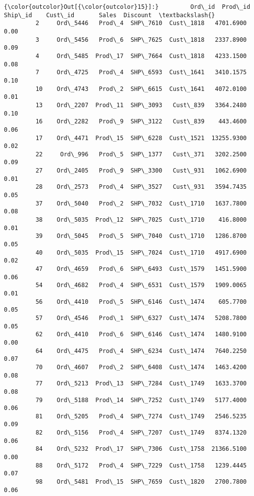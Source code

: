 \documentclass[11pt]{article}
\begin{document}
\begin{Verbatim}[commandchars=\\\{\}]
{\color{outcolor}Out[{\color{outcolor}15}]:}         Ord\_id  Prod\_id   Ship\_id    Cust\_id       Sales  Discount  \textbackslash{}
         2     Ord\_5446   Prod\_4  SHP\_7610  Cust\_1818   4701.6900      0.00   
         3     Ord\_5456   Prod\_6  SHP\_7625  Cust\_1818   2337.8900      0.09   
         4     Ord\_5485  Prod\_17  SHP\_7664  Cust\_1818   4233.1500      0.08   
         7     Ord\_4725   Prod\_4  SHP\_6593  Cust\_1641   3410.1575      0.10   
         10    Ord\_4743   Prod\_2  SHP\_6615  Cust\_1641   4072.0100      0.01   
         13    Ord\_2207  Prod\_11  SHP\_3093   Cust\_839   3364.2480      0.10   
         16    Ord\_2282   Prod\_9  SHP\_3122   Cust\_839    443.4600      0.06   
         17    Ord\_4471  Prod\_15  SHP\_6228  Cust\_1521  13255.9300      0.02   
         22     Ord\_996   Prod\_5  SHP\_1377   Cust\_371   3202.2500      0.09   
         27    Ord\_2405   Prod\_9  SHP\_3300   Cust\_931   1062.6900      0.01   
         28    Ord\_2573   Prod\_4  SHP\_3527   Cust\_931   3594.7435      0.05   
         37    Ord\_5040   Prod\_2  SHP\_7032  Cust\_1710   1637.7800      0.08   
         38    Ord\_5035  Prod\_12  SHP\_7025  Cust\_1710    416.8000      0.01   
         39    Ord\_5045   Prod\_5  SHP\_7040  Cust\_1710   1286.8700      0.05   
         40    Ord\_5035  Prod\_15  SHP\_7024  Cust\_1710   4917.6900      0.02   
         47    Ord\_4659   Prod\_6  SHP\_6493  Cust\_1579   1451.5900      0.06   
         54    Ord\_4682   Prod\_4  SHP\_6531  Cust\_1579   1909.0065      0.01   
         56    Ord\_4410   Prod\_5  SHP\_6146  Cust\_1474    605.7700      0.05   
         57    Ord\_4546   Prod\_1  SHP\_6327  Cust\_1474   5208.7800      0.05   
         62    Ord\_4410   Prod\_6  SHP\_6146  Cust\_1474   1480.9100      0.00   
         64    Ord\_4475   Prod\_4  SHP\_6234  Cust\_1474   7640.2250      0.07   
         70    Ord\_4607   Prod\_2  SHP\_6408  Cust\_1474   1463.4200      0.08   
         77    Ord\_5213  Prod\_13  SHP\_7284  Cust\_1749   1633.3700      0.08   
         79    Ord\_5188  Prod\_14  SHP\_7252  Cust\_1749   5177.4000      0.06   
         81    Ord\_5205   Prod\_4  SHP\_7274  Cust\_1749   2546.5235      0.09   
         82    Ord\_5156   Prod\_4  SHP\_7207  Cust\_1749   8374.1320      0.06   
         84    Ord\_5232  Prod\_17  SHP\_7306  Cust\_1758  21366.5100      0.00   
         88    Ord\_5172   Prod\_4  SHP\_7229  Cust\_1758   1239.4445      0.07   
         98    Ord\_5481  Prod\_15  SHP\_7659  Cust\_1820   2700.7800      0.06   

\end{Verbatim}
\end{document}

